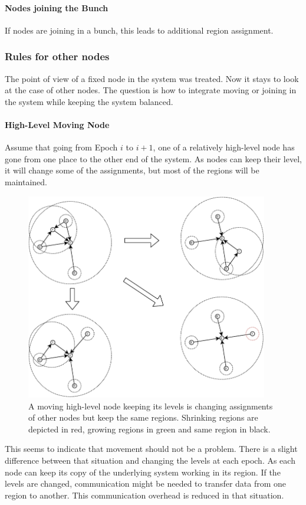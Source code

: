 \documentclass[a4paper,11pt,oneside]{report}
\begin{document}
\paragraph{Nodes joining the Bunch} If nodes are joining in a bunch, this leads
to additional region assignment. 

\subsubsection{Rules for other nodes} The point of view of a fixed node in the
system was treated. Now it stays to look at the case of other nodes. The
question is how to integrate moving or joining in the system while keeping the
system balanced. 

\paragraph{High-Level Moving Node} Assume that going from Epoch $i$ to $i+1$,
one of a relatively high-level node has gone from one place to the other end of
the system. As nodes can keep their level, it will change some of the
assignments, but most of the regions will be maintained. 

\begin{figure}[!h] 
\centering
\includegraphics[width=300pt]{figures/LocarnoTreaties-Moving}
\caption{A moving high-level node keeping its levels is changing assignments of other
  nodes but keep the same regions. Shrinking regions are depicted in red,
  growing regions in green and same region in black. }
\label{fig:LocarnoTreaties-Moving}
\end{figure}

This seems to indicate that movement should not be a problem. There is a
slight difference between that situation and changing the levels at each
epoch. As each node can keep its copy of the underlying system working in its
region. If the levels are changed, communication might be needed to transfer
data from one region to another. This communication overhead is reduced in
that situation. 
\end{document}
